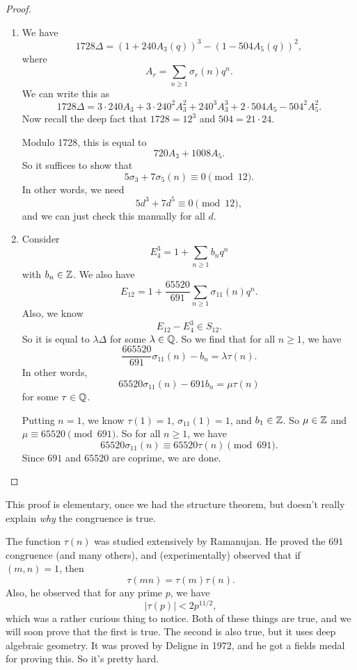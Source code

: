\documentclass[a4paper]{article}
\begin{document}
\begin{proof}\leavevmode
  \begin{enumerate}
    \item We have
      \[
        1728 \Delta = (1 + 240 A_3(q))^3 - (1 - 504 A_5 (q))^2,
      \]
      where
      \[
        A_r = \sum_{n \geq 1} \sigma_r(n) q^n.
      \]
      We can write this as
      \[
         1728\Delta = 3\cdot 240 A_3 + 3\cdot 240^2 A_3^2 + 240^3 A_3^3 + 2\cdot 504 A_5 - 504^2 A_5^2.
      \]
      Now recall the deep fact that $1728 = 12^3$ and $504 = 21 \cdot 24$.

      Modulo 1728, this is equal to
      \[
        720 A_3 + 1008 A_5.
      \]
      So it suffices to show that
      \[
        5 \sigma_3 + 7 \sigma_5(n) \equiv 0 \pmod {12}.
      \]
      In other words, we need
      \[
        5 d^3 + 7 d^5 \equiv 0 \pmod {12},
      \]
      and we can just check this manually for all $d$.
    \item Consider
      \[
        E_4^3 = 1 + \sum_{n \geq 1} b_n q^n
      \]
      with $b_n \in \mathbb{Z}$. We also have
      \[
        E_{12} = 1 + \frac{65520}{691} \sum_{n \geq 1} \sigma_{11}(n) q^n.
      \]
      Also, we know
      \[
        E_{12} - E_4^3 \in S_{12}.
      \]
      So it is equal to $\lambda \Delta$ for some $\lambda \in \mathbb{Q}$. So we find that for all $n \geq 1$, we have
      \[
        \frac{665520}{691} \sigma_{11}(n) - b_n = \lambda \tau(n).
      \]
      In other words,
      \[
        65520 \sigma_{11}(n) - 691 b_n = \mu \tau(n)
      \]
      for some $\tau \in \mathbb{Q}$.

      Putting $n = 1$, we know $\tau(1) = 1$, $\sigma_{11}(1) = 1$, and $b_1 \in \mathbb{Z}$. So $\mu \in \mathbb{Z}$ and $\mu \equiv 65520 \pmod {691}$. So for all $n \geq 1$, we have
      \[
        65520 \sigma_{11}(n) \equiv 65520 \tau(n) \pmod {691}.
      \]
      Since $691$ and $65520$ are coprime, we are done.\qedhere
  \end{enumerate}
\end{proof}
This proof is elementary, once we had the structure theorem, but doesn't really explain \emph{why} the congruence is true.

The function $\tau(n)$ was studied extensively by Ramanujan. He proved the $691$ congruence (and many others), and (experimentally) observed that if $(m, n) = 1$, then
\[
  \tau(mn) = \tau(m) \tau(n).
\]
Also, he observed that for any prime $p$, we have
\[
  |\tau(p)| < 2 p^{11/2},
\]
which was a rather curious thing to notice. Both of these things are true, and we will soon prove that the first is true. The second is also true, but it uses deep algebraic geometry. It was proved by Deligne in 1972, and he got a fields medal for proving this. So it's pretty hard.
\end{document}
